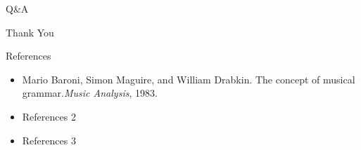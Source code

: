 \documentclass[11pt]{beamer}
\begin{document}
\begin{frame}{Q\&A}
\begin{center}
\Huge Thank You
\end{center}
\end{frame}
 
\begin{frame}{References}
\begin{itemize}
\item Mario Baroni, Simon Maguire, and William Drabkin. The concept of musical grammar.\textit{Music Analysis}, 1983.
\item References 2
\item References 3
\end{itemize}
\end{frame}
\end{document}
